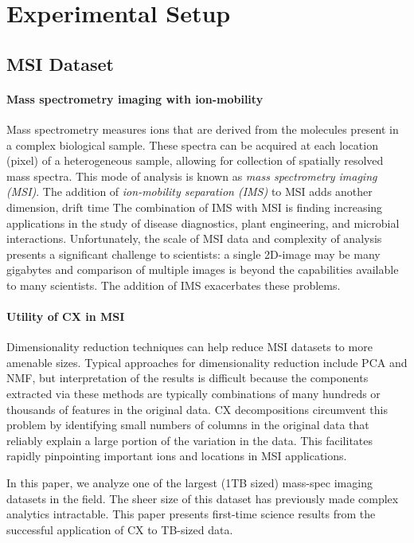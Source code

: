 \section{Experimental Setup}
\label{sec:setup}

\subsection{MSI Dataset}
\paragraph{Mass spectrometry imaging with ion-mobility}
Mass spectrometry measures ions that are derived from the molecules present in a complex biological sample.
These spectra can be acquired at each location (pixel) of a heterogeneous sample, allowing for collection of spatially
resolved mass spectra.
This mode of analysis is known as \textit{mass spectrometry imaging (MSI)}.
The addition of \textit{ion-mobility separation (IMS)} to MSI adds another dimension, drift time
The combination of IMS with MSI is finding increasing applications in the study of disease diagnostics, plant
engineering, and microbial interactions. Unfortunately, the scale of MSI data and complexity of analysis presents a significant challenge to
scientists: a single 2D-image may be many gigabytes and comparison of multiple images is beyond the capabilities
available to many scientists. The addition of IMS exacerbates these problems.

\paragraph{Utility of CX in MSI}
Dimensionality reduction techniques can help reduce MSI datasets to more amenable sizes.
Typical approaches for dimensionality reduction include PCA and NMF, but interpretation of the results is difficult
because the components extracted via these methods are typically combinations of many hundreds or thousands of features in the original data.
CX decompositions circumvent this problem by identifying small numbers of columns in the
original data that reliably explain a large portion of the variation in the data.
This facilitates rapidly pinpointing important ions and locations in MSI applications.

In this paper, we analyze one of the largest (1TB sized) mass-spec
imaging datasets in the field. The sheer size %
of this dataset
has previously made complex analytics intractable. This paper presents first-time science results from the successful application of CX to TB-sized data.

